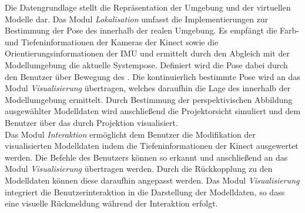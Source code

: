 Die Datengrundlage stellt die Repräsentation der Umgebung und der virtuellen Modelle dar. Das Modul \textit{Lokalisation} umfasst die Implementierungen zur Bestimmung der Pose des  innerhalb der realen Umgebung. Es empfängt die Farb- und Tiefeninformationen der Kameras der Kinect sowie die Orientierungsinformationen der IMU und ermittelt durch den Abgleich mit der Modellumgebung die aktuelle Systempose. Definiert wird die Pose dabei durch den Benutzer über Bewegung des . Die kontinuierlich bestimmte Pose wird an das Modul \textit{Visualisierung} übertragen, welches daraufhin die Lage des  innerhalb der Modellumgebung ermittelt. Durch Bestimmung der perspektivischen Abbildung ausgewählter Modelldaten wird anschließend die Projektorsicht simuliert und dem Benutzer über das \kps{} durch Projektion visualisiert.\\ 

Das Modul \textit{Interaktion} ermöglicht dem Benutzer die Modifikation der visualisierten Modelldaten indem die Tiefeninformationen der Kinect ausgewertet werden. Die Befehle des Benutzers können so erkannt und anschließend an das Modul \textit{Visualisierung} übertragen werden. Durch die Rückkopplung zu den Modelldaten können diese daraufhin angepasst werden. Das Modul \textit{Visualisierung} integriert die Benutzerinteraktion in die Darstellung der Modelldaten, so dass eine visuelle Rückmeldung während der Interaktion erfolgt.\\

